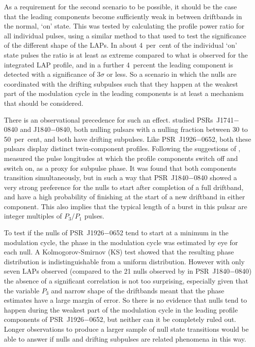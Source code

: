 As a requirement for the second scenario to be possible, it should be the case that the leading components become sufficiently weak in between driftbands in the normal, `on' state. This was tested by calculating the profile power ratio for all individual pulses, using a similar method to that used to test the significance of the different shape of the LAPs. In about 4~per~cent of the individual `on' state pulses the ratio is at least as extreme compared to what is observed for the integrated LAP profile, and in a further 4~percent the leading component is detected with a significance of $3\sigma$ or less. So a scenario in which the nulls are coordinated with the drifting subpulses such that they happen at the weakest part of the modulation cycle in the leading components is at least a mechanism that should be considered.

There is an observational precedence for such an effect. \citet{GYY+2017} studied PSRs~J1741$-$0840 and J1840$-$0840, both nulling pulsars with a nulling fraction between 30 to 50~per~cent, and both have drifting subpulses. Like PSR~J1926$-$0652, both these pulsars display distinct twin-component profiles. 
Following the suggestions of \citet{JVxx2000}, \citet{GYY+2017} measured the pulse longitudes at which the profile components switch off and switch on, as a proxy for subpulse phase. 
It was found that both components transition simultaneously, but in such a way that PSR~J1840$-$0840 showed a very strong preference for the nulls to start after completion of a full driftband, and have a high probability of finishing at the start of a new driftband in either component. This also implies that the typical length of a burst in this pulsar are integer multiples of $P_3/P_1$ pulses.

To test if the nulls of PSR~J1926$-$0652 tend to start at a minimum in the modulation cycle, the phase in the modulation cycle was estimated by eye for each null. A Kolmogorov-Smirnov (KS) test showed that the resulting phase distribution is indistinguishable from a uniform distribution. However with only seven LAPs observed (compared to the 21 nulls observed by \citealt{GYY+2017} in PSR~J1840$-$0840) the absence of a significant correlation is not too surprising, especially given that the variable $P_3$ and narrow shape of the driftbands meant that the phase estimates have a large margin of error. So there is no evidence that nulls tend to happen during the weakest part of the modulation cycle in the leading profile components of PSR~J1926$-$0652, but neither can it be completely ruled out. Longer observations to produce a larger sample of null state transitions would be able to answer if nulls and drifting subpulses are related phenomena in this way. 

